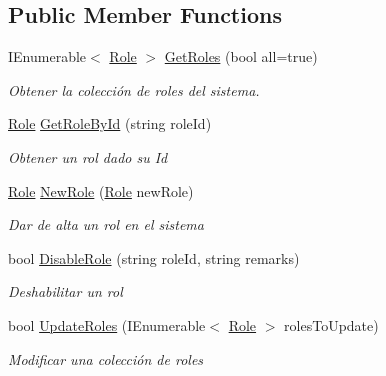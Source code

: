 \subsection*{Public Member Functions}
\begin{DoxyCompactItemize}
\item 
I\+Enumerable$<$ \mbox{\hyperlink{class_h_k_supply_1_1_models_1_1_role}{Role}} $>$ \mbox{\hyperlink{class_h_k_supply_1_1_services_1_1_implementations_1_1_e_f_role_a7fd2f7f9bae498128f23ad0659e3ec4a}{Get\+Roles}} (bool all=true)
\begin{DoxyCompactList}\small\item\em Obtener la colección de roles del sistema. \end{DoxyCompactList}\item 
\mbox{\hyperlink{class_h_k_supply_1_1_models_1_1_role}{Role}} \mbox{\hyperlink{class_h_k_supply_1_1_services_1_1_implementations_1_1_e_f_role_ad4eb9194531a9215c4f1a20ab0d9aa54}{Get\+Role\+By\+Id}} (string role\+Id)
\begin{DoxyCompactList}\small\item\em Obtener un rol dado su Id \end{DoxyCompactList}\item 
\mbox{\hyperlink{class_h_k_supply_1_1_models_1_1_role}{Role}} \mbox{\hyperlink{class_h_k_supply_1_1_services_1_1_implementations_1_1_e_f_role_a549317ad8c8fb3353382a8cd36fa1b22}{New\+Role}} (\mbox{\hyperlink{class_h_k_supply_1_1_models_1_1_role}{Role}} new\+Role)
\begin{DoxyCompactList}\small\item\em Dar de alta un rol en el sistema \end{DoxyCompactList}\item 
bool \mbox{\hyperlink{class_h_k_supply_1_1_services_1_1_implementations_1_1_e_f_role_adf253e840ea77e23fd7c10899f316f21}{Disable\+Role}} (string role\+Id, string remarks)
\begin{DoxyCompactList}\small\item\em Deshabilitar un rol \end{DoxyCompactList}\item 
bool \mbox{\hyperlink{class_h_k_supply_1_1_services_1_1_implementations_1_1_e_f_role_a2d880fce95c33f7581f2e3310ca943ed}{Update\+Roles}} (I\+Enumerable$<$ \mbox{\hyperlink{class_h_k_supply_1_1_models_1_1_role}{Role}} $>$ roles\+To\+Update)
\begin{DoxyCompactList}\small\item\em Modificar una colección de roles \end{DoxyCompactList}\end{DoxyCompactItemize}


